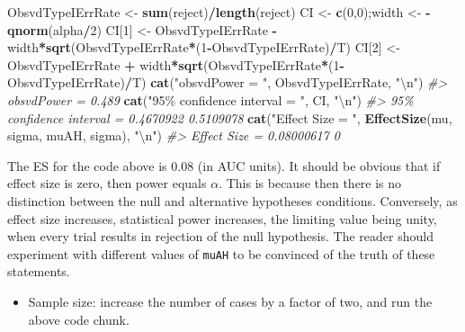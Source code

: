 \documentclass[
]{book}
\newenvironment{Shaded}{\begin{snugshade}}{\end{snugshade}}
\newcommand{\CharTok}[1]{\textcolor[rgb]{0.31,0.60,0.02}{#1}}
\newcommand{\CommentTok}[1]{\textcolor[rgb]{0.56,0.35,0.01}{\textit{#1}}}
\newcommand{\DecValTok}[1]{\textcolor[rgb]{0.00,0.00,0.81}{#1}}
\newcommand{\KeywordTok}[1]{\textcolor[rgb]{0.13,0.29,0.53}{\textbf{#1}}}
\newcommand{\NormalTok}[1]{#1}
\newcommand{\OperatorTok}[1]{\textcolor[rgb]{0.81,0.36,0.00}{\textbf{#1}}}
\newcommand{\StringTok}[1]{\textcolor[rgb]{0.31,0.60,0.02}{#1}}
\providecommand{\tightlist}{%
  \setlength{\itemsep}{0pt}\setlength{\parskip}{0pt}}
\begin{document}
\begin{Shaded}
\begin{Highlighting}[]
\NormalTok{ObsvdTypeIErrRate \textless{}{-}}\StringTok{ }\KeywordTok{sum}\NormalTok{(reject)}\OperatorTok{/}\KeywordTok{length}\NormalTok{(reject)}
\NormalTok{CI \textless{}{-}}\StringTok{ }\KeywordTok{c}\NormalTok{(}\DecValTok{0}\NormalTok{,}\DecValTok{0}\NormalTok{);width \textless{}{-}}\StringTok{ }\OperatorTok{{-}}\KeywordTok{qnorm}\NormalTok{(alpha}\OperatorTok{/}\DecValTok{2}\NormalTok{)}
\NormalTok{CI[}\DecValTok{1}\NormalTok{] \textless{}{-}}\StringTok{ }\NormalTok{ObsvdTypeIErrRate }\OperatorTok{{-}}\StringTok{ }\NormalTok{width}\OperatorTok{*}\KeywordTok{sqrt}\NormalTok{(ObsvdTypeIErrRate}\OperatorTok{*}\NormalTok{(}\DecValTok{1}\OperatorTok{{-}}\NormalTok{ObsvdTypeIErrRate)}\OperatorTok{/}\NormalTok{T)}
\NormalTok{CI[}\DecValTok{2}\NormalTok{] \textless{}{-}}\StringTok{ }\NormalTok{ObsvdTypeIErrRate }\OperatorTok{+}\StringTok{ }\NormalTok{width}\OperatorTok{*}\KeywordTok{sqrt}\NormalTok{(ObsvdTypeIErrRate}\OperatorTok{*}\NormalTok{(}\DecValTok{1}\OperatorTok{{-}}\NormalTok{ObsvdTypeIErrRate)}\OperatorTok{/}\NormalTok{T)}
\KeywordTok{cat}\NormalTok{(}\StringTok{"obsvdPower = "}\NormalTok{, ObsvdTypeIErrRate, }\StringTok{"}\CharTok{\textbackslash{}n}\StringTok{"}\NormalTok{)}
\CommentTok{\#\textgreater{} obsvdPower =  0.489}
\KeywordTok{cat}\NormalTok{(}\StringTok{"95\% confidence interval = "}\NormalTok{, CI, }\StringTok{"}\CharTok{\textbackslash{}n}\StringTok{"}\NormalTok{)}
\CommentTok{\#\textgreater{} 95\% confidence interval =  0.4670922 0.5109078}
\KeywordTok{cat}\NormalTok{(}\StringTok{"Effect Size = "}\NormalTok{, }\KeywordTok{EffectSize}\NormalTok{(mu, sigma, muAH, sigma), }\StringTok{"}\CharTok{\textbackslash{}n}\StringTok{"}\NormalTok{)}
\CommentTok{\#\textgreater{} Effect Size =  0.08000617 0}
\end{Highlighting}
\end{Shaded}

The ES for the code above is 0.08 (in AUC units). It should be obvious that if effect size is zero, then power equals \(\alpha\). This is because then there is no distinction between the null and alternative hypotheses conditions. Conversely, as effect size increases, statistical power increases, the limiting value being unity, when every trial results in rejection of the null hypothesis. The reader should experiment with different values of \texttt{muAH} to be convinced of the truth of these statements.

\begin{itemize}
\tightlist
\item
  Sample size: increase the number of cases by a factor of two, and run the above code chunk.
\end{itemize}
\end{document}
